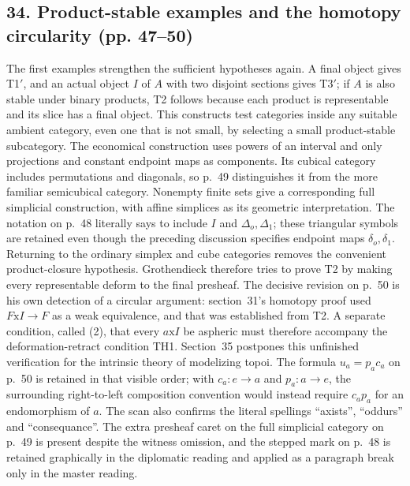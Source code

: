 \subsection*{34. Product-stable examples and the homotopy circularity (pp. 47--50)}
The first examples strengthen the sufficient hypotheses again. A final object gives T1$'$, and an actual object $I$ of $A$ with two disjoint sections gives T3$'$; if $A$ is also stable under binary products, T2 follows because each product is representable and its slice has a final object. This constructs test categories inside any suitable ambient category, even one that is not small, by selecting a small product-stable subcategory. The economical construction uses powers of an interval and only projections and constant endpoint maps as components. Its cubical category includes permutations and diagonals, so p.~49 distinguishes it from the more familiar semicubical category. Nonempty finite sets give a corresponding full simplicial construction, with affine simplices as its geometric interpretation. The notation on p.~48 literally says to include $I$ and $\Delta_o,\Delta_1$; these triangular symbols are retained even though the preceding discussion specifies endpoint maps $\delta_o,\delta_1$. Returning to the ordinary simplex and cube categories removes the convenient product-closure hypothesis. Grothendieck therefore tries to prove T2 by making every representable deform to the final presheaf. The decisive revision on p.~50 is his own detection of a circular argument: section~31's homotopy proof used $F\mathrm{x}I\to F$ as a weak equivalence, and that was established from T2. A separate condition, called (2), that every $a\mathrm{x}I$ be aspheric must therefore accompany the deformation-retract condition TH1. Section~35 postpones this unfinished verification for the intrinsic theory of modelizing topoi. The formula $u_a=p_a c_a$ on p.~50 is retained in that visible order; with $c_a:e\to a$ and $p_a:a\to e$, the surrounding right-to-left composition convention would instead require $c_a p_a$ for an endomorphism of $a$. The scan also confirms the literal spellings ``axists'', ``oddurs'' and ``consequance''. The extra presheaf caret on the full simplicial category on p.~49 is present despite the witness omission, and the stepped mark on p.~48 is retained graphically in the diplomatic reading and applied as a paragraph break only in the master reading.
